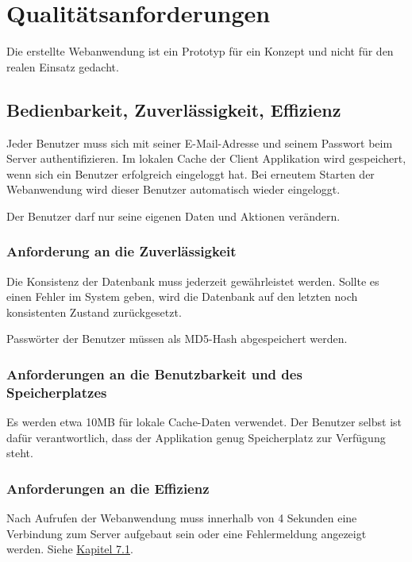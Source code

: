 \documentclass[a4paper,12pt,oneside]{scrartcl}
\begin{document}
\section{Qualitätsanforderungen}
Die erstellte Webanwendung ist ein Prototyp für ein Konzept und nicht für den realen Einsatz gedacht.


\subsection{Bedienbarkeit, Zuverlässigkeit, Effizienz}
Jeder Benutzer muss sich mit seiner E-Mail-Adresse und seinem Passwort beim Server authentifizieren. 
Im lokalen Cache der Client Applikation wird gespeichert, wenn sich ein Benutzer erfolgreich eingeloggt hat. 
Bei erneutem Starten der Webanwendung wird dieser Benutzer automatisch wieder eingeloggt. 

Der Benutzer darf nur seine eigenen Daten und Aktionen verändern.



\subsubsection{Anforderung an die Zuverlässigkeit}
Die Konsistenz der Datenbank muss jederzeit gewährleistet werden.
Sollte es einen Fehler im System geben, wird die Datenbank auf den letzten noch konsistenten Zustand zurückgesetzt.

Passwörter der Benutzer müssen als MD5-Hash abgespeichert werden.


\subsubsection{Anforderungen an die Benutzbarkeit und des Speicherplatzes}
Es werden etwa 10MB für lokale Cache-Daten verwendet.
Der Benutzer selbst ist dafür verantwortlich, dass der Applikation genug Speicherplatz zur Verfügung steht. 


\subsubsection{Anforderungen an die Effizienz}
Nach Aufrufen der Webanwendung muss innerhalb von 4 Sekunden eine Verbindung zum Server aufgebaut sein oder eine Fehlermeldung angezeigt werden.
Siehe \hyperlink{s07}{Kapitel 7.1}.
\end{document}
